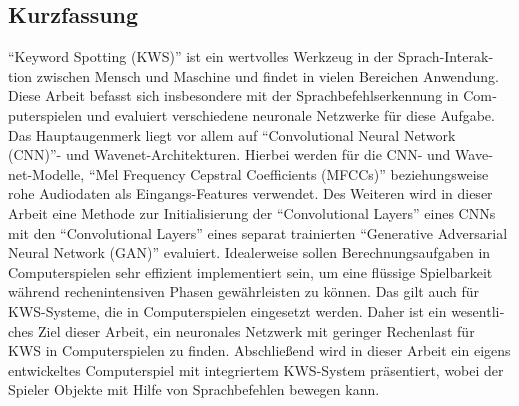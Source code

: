 \begin{otherlanguage}{ngerman}
\chapter*{Kurzfassung}
\enquote{Keyword Spotting (KWS)} ist ein wertvolles Werkzeug in der Sprach-Interaktion zwischen Mensch und Maschine und findet in vielen Bereichen Anwendung.
Diese Arbeit befasst sich insbesondere mit der Sprachbefehlserkennung in Computerspielen und evaluiert verschiedene neuronale Netzwerke für diese Aufgabe.
Das Hauptaugenmerk liegt vor allem auf \enquote{Convolutional Neural Network (CNN)}- und Wavenet-Architekturen.
Hierbei werden für die CNN- und Wavenet-Modelle, \enquote{Mel Frequency Cepstral Coefficients (MFCCs)} beziehungsweise rohe Audiodaten als Eingangs-Features verwendet.
Des Weiteren wird in dieser Arbeit eine Methode zur Initialisierung der \enquote{Convolutional Layers} eines CNNs mit den \enquote{Convolutional Layers} eines separat trainierten \enquote{Generative Adversarial Neural Network (GAN)} evaluiert.
Idealerweise sollen Berechnungsaufgaben in Computerspielen sehr effizient implementiert sein, um eine flüssige Spielbarkeit während rechenintensiven Phasen gewährleisten zu können.
Das gilt auch für KWS-Systeme, die in Computerspielen eingesetzt werden.
Daher ist ein wesentliches Ziel dieser Arbeit, ein neuronales Netzwerk mit geringer Rechenlast für KWS in Computerspielen zu finden.
Abschließend wird in dieser Arbeit ein eigens entwickeltes Computerspiel mit integriertem KWS-System präsentiert, wobei der Spieler Objekte mit Hilfe von Sprachbefehlen bewegen kann.
\end{otherlanguage}
